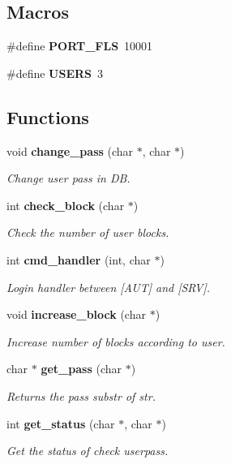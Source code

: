 \subsection*{Macros}
\begin{DoxyCompactItemize}
\item 
\#define \textbf{ P\+O\+R\+T\+\_\+\+F\+LS}~10001
\item 
\#define \textbf{ U\+S\+E\+RS}~3
\end{DoxyCompactItemize}
\subsection*{Functions}
\begin{DoxyCompactItemize}
\item 
void \textbf{ change\+\_\+pass} (char $\ast$, char $\ast$)
\begin{DoxyCompactList}\small\item\em Change user pass in DB. \end{DoxyCompactList}\item 
int \textbf{ check\+\_\+block} (char $\ast$)
\begin{DoxyCompactList}\small\item\em Check the number of user blocks. \end{DoxyCompactList}\item 
int \textbf{ cmd\+\_\+handler} (int, char $\ast$)
\begin{DoxyCompactList}\small\item\em Login handler between [A\+UT] and [S\+RV]. \end{DoxyCompactList}\item 
void \textbf{ increase\+\_\+block} (char $\ast$)
\begin{DoxyCompactList}\small\item\em Increase number of blocks according to user. \end{DoxyCompactList}\item 
char $\ast$ \textbf{ get\+\_\+pass} (char $\ast$)
\begin{DoxyCompactList}\small\item\em Returns the pass substr of str. \end{DoxyCompactList}\item 
int \textbf{ get\+\_\+status} (char $\ast$, char $\ast$)
\begin{DoxyCompactList}\small\item\em Get the status of check userpass. \end{DoxyCompactList}\item 

\end{DoxyCompactItemize}
